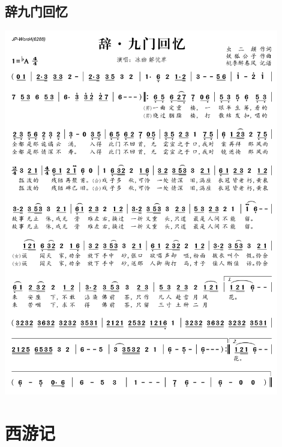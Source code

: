 \documentclass[cn,pad,twocol]{elegantbook}
\begin{document}
\section{辞九门回忆} \includegraphics[width=0.9\textwidth]{macos/2020辞九门回忆.png}

\chapter{西游记}
\end{document}

